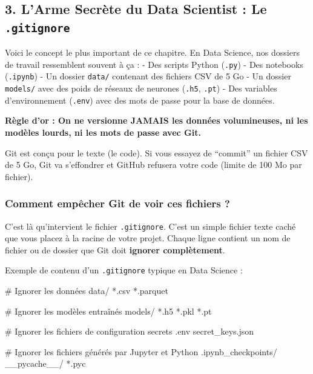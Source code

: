 \documentclass[
  letterpaper,
  DIV=11,
  numbers=noendperiod]{scrreprt}
\newenvironment{Shaded}{\begin{snugshade}}{\end{snugshade}}
\newcommand{\NormalTok}[1]{\textcolor[rgb]{0.00,0.23,0.31}{#1}}
\begin{document}
\subsection{\texorpdfstring{3. L'Arme Secrète du Data Scientist : Le
\texttt{.gitignore}}{3. L'Arme Secrète du Data Scientist : Le .gitignore}}\label{larme-secruxe8te-du-data-scientist-le-.gitignore}

Voici le concept le plus important de ce chapitre. En Data Science, nos
dossiers de travail ressemblent souvent à ça : - Des scripts Python
(\texttt{.py}) - Des notebooks (\texttt{.ipynb}) - Un dossier
\texttt{data/} contenant des fichiers CSV de 5 Go - Un dossier
\texttt{models/} avec des poids de réseaux de neurones (\texttt{.h5},
\texttt{.pt}) - Des variables d'environnement (\texttt{.env}) avec des
mots de passe pour la base de données.

\textbf{Règle d'or : On ne versionne JAMAIS les données volumineuses, ni
les modèles lourds, ni les mots de passe avec Git.}

Git est conçu pour le texte (le code). Si vous essayez de ``commit'' un
fichier CSV de 5 Go, Git va s'effondrer et GitHub refusera votre code
(limite de 100 Mo par fichier).

\subsubsection{Comment empêcher Git de voir ces fichiers
?}\label{comment-empuxeacher-git-de-voir-ces-fichiers}

C'est là qu'intervient le fichier \texttt{.gitignore}. C'est un simple
fichier texte caché que vous placez à la racine de votre projet. Chaque
ligne contient un nom de fichier ou de dossier que Git doit
\textbf{ignorer complètement}.

Exemple de contenu d'un \texttt{.gitignore} typique en Data Science :

\begin{Shaded}
\begin{Highlighting}[]
\NormalTok{\# Ignorer les données}
\NormalTok{data/}
\NormalTok{*.csv}
\NormalTok{*.parquet}

\NormalTok{\# Ignorer les modèles entraînés}
\NormalTok{models/}
\NormalTok{*.h5}
\NormalTok{*.pkl}
\NormalTok{*.pt}

\NormalTok{\# Ignorer les fichiers de configuration secrets}
\NormalTok{.env}
\NormalTok{secret\_keys.json}

\NormalTok{\# Ignorer les fichiers générés par Jupyter et Python}
\NormalTok{.ipynb\_checkpoints/}
\NormalTok{\_\_pycache\_\_/}
\NormalTok{*.pyc}
\end{Highlighting}
\end{Shaded}
\end{document}
